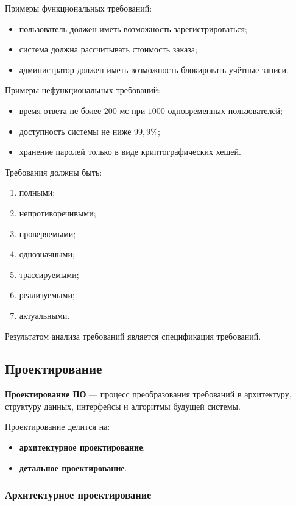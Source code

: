 \documentclass[12pt,a4paper]{article}
\begin{document}
Примеры функциональных требований:
\begin{itemize}
    \item пользователь должен иметь возможность зарегистрироваться;
    \item система должна рассчитывать стоимость заказа;
    \item администратор должен иметь возможность блокировать учётные записи.
\end{itemize}

Примеры нефункциональных требований:
\begin{itemize}
    \item время ответа не более $200$ мс при $1000$ одновременных пользователей;
    \item доступность системы не ниже $99{,}9\%$;
    \item хранение паролей только в виде криптографических хешей.
\end{itemize}

Требования должны быть:
\begin{enumerate}
    \item полными;
    \item непротиворечивыми;
    \item проверяемыми;
    \item однозначными;
    \item трассируемыми;
    \item реализуемыми;
    \item актуальными.
\end{enumerate}

Результатом анализа требований является спецификация требований.

\subsection{Проектирование}

\textbf{Проектирование ПО} --- процесс преобразования требований в архитектуру, структуру данных, интерфейсы и алгоритмы будущей системы.

Проектирование делится на:
\begin{itemize}
    \item \textbf{архитектурное проектирование};
    \item \textbf{детальное проектирование}.
\end{itemize}

\subsubsection{Архитектурное проектирование}
\end{document}
